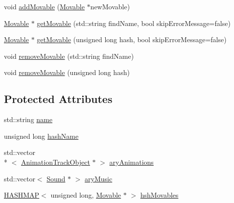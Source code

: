 \begin{DoxyCompactItemize}
void \hyperlink{class_rad_xml_1_1_level_a4d7f95bc0e9c0fb46357ff16b4afb5a1}{add\-Movable} (\hyperlink{class_rad_xml_1_1_movable}{Movable} $\ast$new\-Movable)
\item 
\hyperlink{class_rad_xml_1_1_movable}{Movable} $\ast$ \hyperlink{class_rad_xml_1_1_level_a844534e286dfc1b327faecdd2ce83242}{get\-Movable} (std\-::string find\-Name, bool skip\-Error\-Message=false)
\item 
\hyperlink{class_rad_xml_1_1_movable}{Movable} $\ast$ \hyperlink{class_rad_xml_1_1_level_a3b438a2988fa0a065f0ff434ff6fe995}{get\-Movable} (unsigned long hash, bool skip\-Error\-Message=false)
\item 
void \hyperlink{class_rad_xml_1_1_level_ad068f6b01102eeaf395608cb6b38c293}{remove\-Movable} (std\-::string find\-Name)
\item 
void \hyperlink{class_rad_xml_1_1_level_aacc65f54436d60901153c14390015df7}{remove\-Movable} (unsigned long hash)
\end{DoxyCompactItemize}
\subsection*{Protected Attributes}
\begin{DoxyCompactItemize}
\item 
std\-::string \hyperlink{class_rad_xml_1_1_level_abc776669bbb0f37a6eed054b3708807b}{name}
\item 
unsigned long \hyperlink{class_rad_xml_1_1_level_a55340f8e1a6347401bbb6069078d6430}{hash\-Name}
\item 
std\-::vector\\*
$<$ \hyperlink{class_rad_xml_1_1_animation_track_object}{Animation\-Track\-Object} $\ast$ $>$ \hyperlink{class_rad_xml_1_1_level_a823afaa7e23e9119030f46c94fdd8f40}{ary\-Animations}
\item 
std\-::vector$<$ \hyperlink{class_rad_xml_1_1_sound}{Sound} $\ast$ $>$ \hyperlink{class_rad_xml_1_1_level_a5767ff38a0f5ab0577914374a7a1a290}{ary\-Music}
\item 
\hyperlink{_rad_xml_xml_file_8h_a850417c8db77ee8afd12a38071844035}{H\-A\-S\-H\-M\-A\-P}$<$ unsigned long, \hyperlink{class_rad_xml_1_1_movable}{Movable} $\ast$ $>$ \hyperlink{class_rad_xml_1_1_level_a7e8fac30e5a73c9c4e4c73c6f2714b95}{hsh\-Movables}
\end{DoxyCompactItemize}


